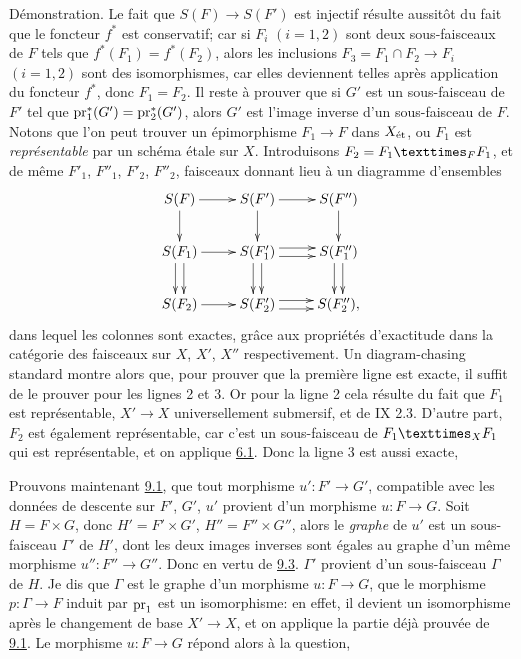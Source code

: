 \documentclass[10pt]{../fichiers-configuration-latex/smfart}
\begin{document}
\noindent
Démonstration. Le fait que $S(F)\rightarrow S(F')$ est injectif
résulte aussitôt du fait que le foncteur $f^{\ast}$ est conservatif;
car si $F_{i}$ $(i=1,2)$ sont deux sous-faisceaux de $F$ tels que
$f^{\ast}(F_{1})=f^{\ast}(F_{2})$, alors les inclusions
$F_{3}=F_{1}\cap F_{2}\rightarrow F_{i}$ $(i=1,2)$ sont des
isomorphismes, car elles deviennent telles après application du
foncteur $f^{\ast}$, donc $F_{1}=F_{2}$. Il reste à prouver que si
$G'$ est un sous-faisceau de $F'$ tel que
$\operatorname{pr}^{\ast}_{1}(G')=\operatorname{pr}^{\ast}_{2}(G')$, alors $G'$ est l'image
inverse d'un sous-faisceau de $F$. Notons que l'on peut trouver un
épimorphisme $F_{1}\rightarrow F$ dans $X_{\text{\rm ét}}$, ou
$F_{1}$ est \emph{représentable} par un schéma étale sur $X$.
Introduisons $F_{2}=\fprod{F_{1}}{F_{1}}{F}$, et de même $F'_{1}$,
$F''_{1}$, $F'_{2}$, $F''_{2}$, faisceaux donnant lieu à un
diagramme d'ensembles
\[
\xymatrix@R=.75cm{
  S(F)  \ar[r] \ar[d]& S(F') \ar[r]\ar[d] & S(F'') \ar[d]\\
S(F_1) \ar[r] \ar@<3pt>[d] \ar@<-3pt>[d]& S(F'_1) \ar@<3pt>[r]
  \ar@<-3pt>[r] \ar@<3pt>[d] \ar@<-3pt>[d]& S(F''_{1})\ar@<3pt>[d] \ar@<-3pt>[d] \\
S(F_2)  \ar[r] & S(F'_2)\ar@<3pt>[r]
  \ar@<-3pt>[r] & S(F''_2),
}
\]
dans lequel les colonnes sont exactes, grâce aux propriétés
d'exactitude dans la catégorie des faisceaux sur $X$, $X'$, $X''$
respectivement. Un diagram-chasing standard montre alors que, pour
prouver que la première ligne est exacte, il suffit de le prouver pour
les lignes 2 et 3. Or pour la ligne 2 cela résulte du fait que $F_{1}$
est représentable, $X'\rightarrow X$ universellement\pageoriginale
submersif, et de \SGA{} IX 2.3. D'autre part, $F_{2}$ est également
représentable, car c'est un sous-faisceau de $\fprod{F_{1}}{F_{1}}{X}$
qui est représentable, et on applique \hyperref[VIII.prop6.1]{6.1}. Donc la ligne 3 est aussi
exacte, \cqfd

Prouvons maintenant \hyperref[VIII.prop9.1]{9.1}, \ie que tout morphisme
$u':F'\rightarrow G'$, compatible avec les données de descente sur
$F'$, $G'$, $u'$ provient d'un morphisme $u:F\rightarrow G$. Soit
$H=F\times G$, donc $H'=F'\times G'$, $H''=F''\times G''$, alors le
\emph{graphe} de $u'$ est un sous-faisceau $\Gamma'$ de $H'$, dont
les deux images inverses sont égales au graphe d'un même morphisme
$u'':F''\rightarrow G''$. Donc en vertu de \hyperref[VIII.lem9.3]{9.3}.
$\Gamma'$ provient d'un sous-faisceau $\Gamma$ de $H$. Je dis que
$\Gamma$ est le graphe d'un morphisme $u:F\rightarrow G$, \ie que le
morphisme $p:\Gamma\rightarrow F$ induit par $\operatorname{pr}_{1}$ est un
isomorphisme: en effet, il devient un isomorphisme après le
changement de base $X'\rightarrow X$, et on applique la partie déjà
prouvée de \hyperref[VIII.prop9.1]{9.1}. Le morphisme $u:F\rightarrow G$
répond alors à la question, \cqfd
\end{document}
